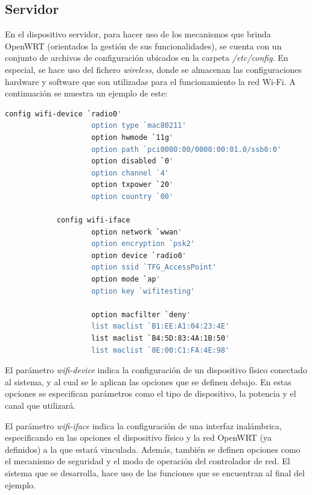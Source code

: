 \documentclass[12pt]{article}
\begin{document}
    \subsection{Servidor}
        En el dispositivo servidor, para hacer uso de los mecanismos que brinda OpenWRT (orientados la gestión de sus funcionalidades), se cuenta con un conjunto de archivos de configuración ubicados en la carpeta \textit{/etc/config}. En especial, se hace uso del fichero \textit{wireless}, donde se almacenan las configuraciones hardware y software que son utilizadas para el funcionamiento la red Wi-Fi. A continuación se muestra un ejemplo de este:
        \begin{lstlisting}[caption=/etc/config/wireless, language=bash]
            config wifi-device `radio0'
                    option type `mac80211'
                    option hwmode `11g'
                    option path `pci0000:00/0000:00:01.0/ssb0:0'
                    option disabled `0'
                    option channel `4'
                    option txpower `20'
                    option country `00'

            config wifi-iface
                    option network `wwan'
                    option encryption `psk2'
                    option device `radio0'
                    option ssid `TFG_AccessPoint'
                    option mode `ap'
                    option key `wifitesting'

                    option macfilter `deny'
                    list maclist `B1:EE:A1:04:23:4E'
                    list maclist `B4:5D:83:4A:1B:50'
                    list maclist `0E:00:C1:FA:4E:98'
        \end{lstlisting}

        El parámetro \textit{wifi-device} indica la configuración de un dispositivo físico conectado al sistema, y al cual se le aplican las opciones que se definen debajo. En estas opciones se especifican parámetros como el tipo de dispositivo, la potencia y el canal que utilizará.

        El parámetro \textit{wifi-iface} indica la configuración de una interfaz inalámbrica, especificando en las opciones el dispositivo físico y la red OpenWRT (ya definidos) a la que estará vinculada. Además, también se definen opciones como el mecanismo de seguridad y el modo de operación del controlador de red. El sistema que se desarrolla, hace uso de las funciones que se encuentran al final del ejemplo.
        
\end{document}
